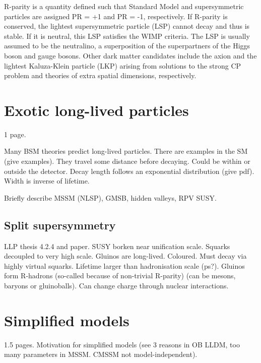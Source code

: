 R-parity is a quantity defined such that Standard Model and supersymmetric 
particles are assigned PR = +1 and PR = -1, respectively. If R-parity is 
conserved, the lightest supersymmetric particle (LSP) cannot decay and thus is 
stable. If it is neutral, this LSP satisfies the WIMP criteria. The LSP is 
usually assumed to be the neutralino, a superposition of the superpartners of 
the Higgs boson and gauge bosons. Other dark matter candidates include the 
axion and the lightest Kaluza-Klein particle (LKP) arising from solutions to 
the strong CP problem and theories of extra spatial dimensions, respectively.

\section{Exotic long-lived particles}
\begin{comment}
More details on LL theories (see LLP thesis, rob slides, my IC/SUSY slides 
etc.), R-hadron, displaced-X searches, GMSB? Note that LLPs exist in SM – call 
them BSMLLPs or LL DM/SUSY signatures? – no, exotic LLPs!
\end{comment}
1 page.

Many BSM theories predict long-lived particles. There are examples in the SM 
(give examples). They travel some distance before decaying. Could be within or 
outside the detector. Decay length follows an exponential distribution (give 
pdf). Width is inverse of lifetime.

Briefly describe MSSM (NLSP), GMSB, hidden valleys, RPV SUSY.

\subsection{Split supersymmetry}
LLP thesis 4.2.4 and paper.
SUSY borken near unification scale. Squarks decoupled to very 
high scale. Gluinos are long-lived. Coloured. Must 
decay via highly virtual squarks. Lifetime larger than hadronisation scale 
(ps?). Gluinos form R-hadrons (so-called because of non-trivial R-parity) (can 
be mesons, baryons or gluinoballs). Can change charge through nuclear 
interactions.


\section{Simplified models}

1.5 pages. Motivation for simplified models (see 3 reasons in OB LLDM, too many 
parameters in MSSM. CMSSM not model-independent).

